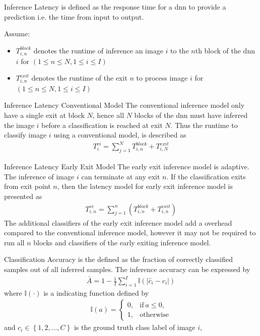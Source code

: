 	\begin{enumdescript}
		\item[Inference Latency] is defined as the response time for a \gls{dnn} to provide a prediction i.e. the time from input to output. 

		Assume:
		\begin{itemize}
			\item $T_{i,n}^{block}$ denotes the runtime of inference an image $ i $ to the $ n $th block of the \gls{dnn} $ i $ for $ \left(1\leq n \leq N, 1 \leq i \leq I\right) $
			\item $T_{i,n}^{exit}$ denotes the runtime of the exit $ n $  to process image $i$ for $ \left(1\leq n \leq N, 1 \leq i \leq I\right) $
		\end{itemize}
		\begin{enumdescript}
			\item[Inference Latency Conventional Model] The conventional inference model only have a single exit at block $ N $, hence all $ N $ blocks of the \gls{dnn} must have inferred the image $ i $ before a classification is reached at exit $ N $. Thus the runtime to classify image $ i $ using a conventional model, is described as
			\begin{align}
			T^{ci}_{i}= \sum_{j=1}^{N} T_{i,n}^{block} + T_{i,N}^{exit}
			\end{align}
			\item[Inference Latency Early Exit Model] The early exit inference model is adaptive. The inference of image $ i $ can terminate at any exit $ n $. If the classification exits from exit point $ n $, then the latency model for early exit inference model is presented as
			\begin{align}
			T_{i,n}^{ee}=\sum_{j=1}^{n} \left(T_{i,n}^{block} + T_{i,n}^{exit} \right) 
			\end{align}
			The additional classifiers of the early exit inference model add a overhead compared to the conventional inference model, however it may not be required to run all $ n $ blocks and classifiers of the early exiting inference model. 
		\end{enumdescript}
		
		\item[Classification Accuracy] is the defined as the fraction of correctly classified samples out of all inferred samples. The inference accuracy can be expressed by
		\begin{align}
		\bar{A}=1-\frac{1}{I} \sum_{i=1}^{I} \mathbb{I}\left(\left|\hat{c}_{i}-c_{i}\right|\right) \label{eq:accuracy}
		\end{align}
		where $ \mathbb{I(\cdot)}  $ is a indicating function defined by
		\begin{align}
		\mathbb{I}(a)= \begin{cases}
		0, & \mathrm{if\:} a \leq 0, \\
		1, & \mathrm{otherwise}
		\end{cases} \label{eq:indicator}
		\end{align}
		and $ c_i \in \left\{1, 2, \dots, C \right\} $ is the ground truth class label of image $ i $,
		

\end{enumdescript}
